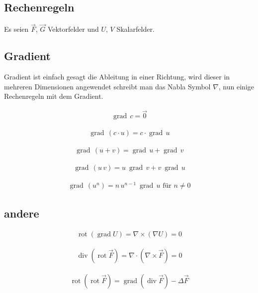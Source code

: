 \documentclass[a4paper]{scrartcl}
\begin{document}
\subsection{Rechenregeln}
Es seien $\vec F$, $\vec G$ Vektorfelder und $U$, $V$ Skalarfelder.


\subsection{Gradient}

Gradient ist einfach gesagt die Ableitung in einer Richtung, wird dieser in mehreren Dimensionen angewendet schreibt man das Nabla Symbol $ \nabla $, nun einige Rechenregeln mit dem Gradient.

\begin{align}
\operatorname{grad}\,c=\vec{0}
\end{align}

\begin{align}
\operatorname{grad}\,(c\cdot u)=c\cdot\operatorname{grad}\,u
\end{align}

\begin{align}
\operatorname{grad}\,(u+v)=\operatorname{grad}\,u+\operatorname{grad}\,v
\end{align}

\begin{align}
\operatorname{grad}\,(u\, v) = u\ \operatorname{grad}\,v + v\ \operatorname{grad}\,u
\end{align}


\begin{align}
\label{eqn:ProduktregelEinesGradientMitPotenzen}
\operatorname{grad}\,(u^n) = n\, u^{n-1}\ \operatorname{grad}\,u \text{ für } n\neq 0
\end{align}


\subsection{andere}
\begin{align}
\operatorname{rot}(\operatorname{grad}U)=\nabla \times (\nabla U) = 0
\end{align}

\begin{align}
\operatorname{div}(\operatorname{rot}\vec{F}) = \nabla \cdot (\nabla \times
\vec F) = 0
\end{align}

\begin{align}
\operatorname{rot}(\operatorname{rot}\vec{F}) =
\operatorname{grad}(\operatorname{div}\vec{F}) -\Delta \vec{F}
\end{align}
\end{document}
